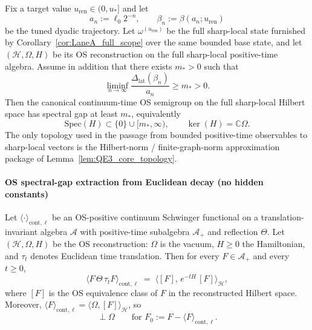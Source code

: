 \begin{theorem}\label{thm:phys_gap_noncollapse}
Fix a target value $u_{\mathrm{ren}}\in(0,u_\ast]$ and let
\[
a_n:=\ell_0 2^{-n},\qquad \beta_n:=\beta(a_n;u_{\mathrm{ren}})
\]
be the tuned dyadic trajectory.
Let $\omega^{(u_{\mathrm{ren}})}$ be the full sharp-local state furnished by Corollary~\ref{cor:LaneA_full_scope} over the same bounded base state, and let $(\mathcal H,\Omega,H)$ be its OS reconstruction on the full sharp-local positive-time algebra.
Assume in addition that there exists $m_*>0$ such that
\[
\liminf_{n\to\infty}\frac{\Delta_{\mathrm{lat}}(\beta_n)}{a_n}\ge m_*>0.
\]
Then the canonical continuum-time OS semigroup on the full sharp-local Hilbert space has spectral gap at least $m_*$, equivalently
\[
\mathrm{Spec}(H)\subset\{0\}\cup[m_*,\infty),
\qquad
\ker(H)=\mathbb C\Omega.
\]
The only topology used in the passage from bounded positive-time observables to sharp-local vectors is the Hilbert-norm / finite-graph-norm approximation package of Lemma~\ref{lem:QE3_core_topology}.
\end{theorem}

\paragraph*{OS spectral-gap extraction from Euclidean decay (no hidden constants)}

\begin{lemma}
\label{lem:OS_semigroup_representation}
Let $\langle\cdot\rangle_{\mathrm{cont},\ell}$ be an OS-positive continuum Schwinger functional on a translation-invariant
algebra $\mathcal A$ with positive-time subalgebra $\mathcal A_+$ and reflection $\Theta$.
Let $(\mathcal H,\Omega,H)$ be the OS reconstruction: $\Omega$ is the vacuum, $H\ge 0$ the Hamiltonian,
and $\tau_t$ denotes Euclidean time translation.
Then for every $F\in\mathcal A_+$ and every $t\ge 0$,
\begin{equation}
 \langle F\,\Theta\,\tau_t F\rangle_{\mathrm{cont},\ell}
 \;=\;
 \langle [F],\,e^{-tH}\,[F]\rangle_{\mathcal H},
 \label{eq:OS_semigroup_identity}
\end{equation}
where $[F]$ is the OS equivalence class of $F$ in the reconstructed Hilbert space.
Moreover, $\langle F\rangle_{\mathrm{cont},\ell}=\langle \Omega,[F]\rangle_{\mathcal H}$, so
\begin{equation}
 [F_0]\perp\Omega\qquad\text{for }F_0:=F-\langle F\rangle_{\mathrm{cont},\ell}.
 \label{eq:OS_mean_zero_orth}
\end{equation}
\end{lemma}

